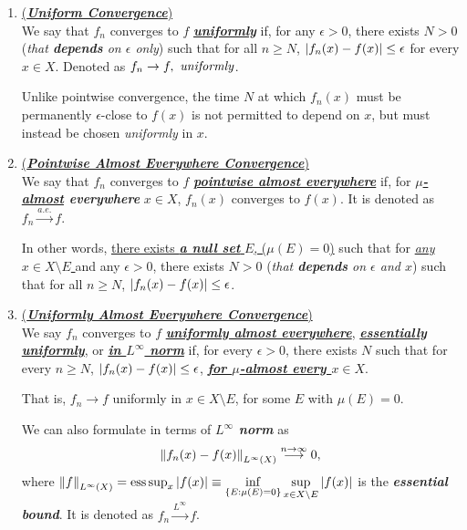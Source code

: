 \documentclass[11pt]{article}
\begin{document}
\begin{itemize}
\begin{enumerate}
\item \begin{definition}  \underline{(\emph{\textbf{Uniform Convergence}})}\\
We say that $f_n$ converges to $f$ \underline{\emph{\textbf{uniformly}}} if,  for any $\epsilon > 0$, there exists $N > 0$ (\emph{that \textbf{depends} on $\epsilon$ only})  such that for all $n \ge N$, $\left\lvert f_n(x) - f(x) \right\rvert \le  \epsilon$  for every $x \in X$. Denoted as $f_{n} \rightarrow f, \text{ \emph{uniformly}}$.
\end{definition}
Unlike pointwise convergence, the time $N$ at which $f_n(x)$ must be permanently $\epsilon$-close to $f(x)$ is not permitted to depend on $x$, but must instead be
chosen \emph{uniformly} in $x$.

\item  \begin{definition}  \underline{(\emph{\textbf{Pointwise Almost Everywhere Convergence}})}\\
We say that  $f_n$ converges to $f$ \underline{\emph{\textbf{pointwise almost everywhere}}} if, for \emph{\textbf{\underline{$\mu$-almost} everywhere}} $x \in X$, $f_n(x)$ converges to
$f(x)$. It is denoted as \underline{$f_{n}\stackrel{a.e.}{\rightarrow} f$}.

In other words, \underline{there exists \emph{\textbf{a null set}} $E$, ($\mu(E) = 0$)} such that for \underline{\emph{any $x\in X \setminus E$ }} and any $\epsilon > 0$, there exists $N > 0$ (\emph{that \textbf{depends} on $\epsilon$ and $x$}) such that for all $n \ge N$, $\left\lvert f_n(x) - f(x) \right\rvert \le  \epsilon$. 
\end{definition}

\item \begin{definition}  \underline{(\emph{\textbf{Uniformly Almost Everywhere Convergence}})} \citep{tao2011introduction}\\
We say $f_n$ converges to $f$ \underline{\emph{\textbf{uniformly almost everywhere}}}, \underline{\emph{\textbf{essentially uniformly}}}, or \underline{\emph{\textbf{in $L^{\infty}$ norm}}} if, for every $\epsilon> 0$, there exists $N$ such that for every $n\ge  N$, $\left\lvert  f_n(x) - f(x) \right\rvert \le \epsilon$, \emph{\textbf{\underline{for $\mu$-almost every $x \in X$}}}. 

That is, $f_n \rightarrow f$ uniformly in $x \in X \setminus E$, for some $E$ with $\mu(E) = 0$.

We can also formulate in terms of \emph{\textbf{$L^{\infty}$ norm}} as 
\begin{align*}
\left\|f_n(x) - f(x)\right\|_{L^{\infty}(X)} \stackrel{n\rightarrow \infty}{\longrightarrow} 0,
\end{align*}
where $\left\|f\right\|_{L^{\infty}(X)} = \text{ess}\sup_{x}\left\lvert f(x) \right\rvert \equiv\inf\limits_{\{E:\mu(E)=0\}}\sup\limits_{x\in X \setminus E}\left\lvert f(x) \right\rvert$ is the \emph{\textbf{essential bound}}. It is denoted as $f_{n}\stackrel{L^{\infty}}{\rightarrow} f$.
\end{definition}


\end{enumerate}
\end{itemize}
\end{document}
